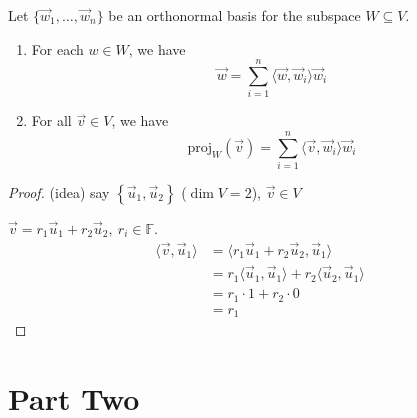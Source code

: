 \documentclass[11pt,fleqn]{book} %
\begin{document}
\begin{proposition}
    Let $\{ \vec{w}_1, \dots, \vec{w}_n \}$ be an orthonormal basis for the subspace $W \subseteq V$. 
    
    \begin{enumerate}[label=\alph*)]
        \item For each $w \in W$, we have $$\vec{w} = \sum_{i=1}^n \langle \vec{w}, \vec{w}_i \rangle \vec{w}_i$$
        \item For all $\vec{v} \in V$, we have $$\mathrm{proj}_W(\vec{v}) = \sum_{i=1}^n \langle \vec{v}, \vec{w}_i \rangle \vec{w}_i$$
    \end{enumerate}
\end{proposition}
\setcounter{chapter}{3}

\begin{proof}
    (idea) say $\left\{ \vec{u}_1, \vec{u}_2 \right\}$ ($\dim V = 2$), $\vec{v} \in V$

    $\vec{v} = r_1\vec{u}_1 + r_2\vec{u}_2,~ r_i \in \mathbb{F}$. 
    \begin{align*}
        \langle \vec{v}, \vec{u}_1 \rangle
        &= \langle r_1\vec{u}_1 + r_2\vec{u}_2, \vec{u}_1 \rangle
        \\
        &= r_1\langle \vec{u}_1, \vec{u}_1 \rangle + r_2 \langle \vec{u}_2, \vec{u}_1 \rangle
        \\
        &= r_1 \cdot 1 + r_2 \cdot 0
        \\
        &= r_1
    \end{align*}
\end{proof}


\part{Part Two}



\end{document}
